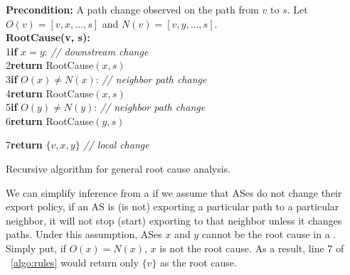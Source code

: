 \begin{pseudocode}[t]
\textbf{Precondition:} A path change observed on the path from $v$
to $s$.  Let $O(v) = [v, x, \ldots, s]$ and
$N(v) = [v, y, \ldots, s]$.\\
\textbf{RootCause(v, s):}\\
%
{\scriptsize 1}\hspace*{1em}\textbf{if} $x = y$:
\hfill\emph{// downstream change}\\
{\scriptsize 2}\hspace*{2em}\textbf{return} RootCause$(x, s)$\\
%
{\scriptsize 3}\hspace*{1em}\textbf{if} $O(x) \ne N(x)$:
\hfill\emph{// neighbor path change}\\
{\scriptsize 4}\hspace*{2em}\textbf{return} RootCause$(x, s)$\\
%
{\scriptsize 5}\hspace*{1em}\textbf{if} $O(y) \ne N(y)$:
\hfill\emph{// neighbor path change}\\
{\scriptsize 6}\hspace*{2em}\textbf{return} RootCause$(y, s)$

{\scriptsize 7}\hspace*{1em}\textbf{return} $\{v, x, y\}$
\hfill\emph{// local change}%
%
\caption{Recursive algorithm for general root cause analysis.}
\label{algo:rules}
\end{pseudocode}

We can simplify inference from a \localC{} if we assume that ASes do not
change their export policy, \ie if an AS is (is not) exporting a
particular path to a particular neighbor, it will not stop (start)
exporting to that neighbor unless it changes paths.  Under this
assumption,  ASes $x$ and $y$ cannot be the root cause in a \localC{}.
Simply put, if $O(x) = N(x)$, $x$ is not the root cause. As a result,
line 7 of \algstr~\ref{algo:rules} would return only $\{v\}$ as the root
cause.


